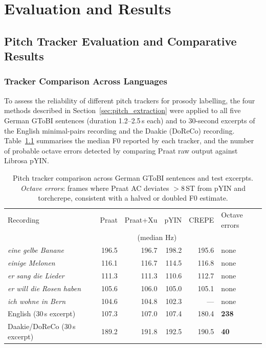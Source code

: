 \chapter{Evaluation and Results}
\label{testing}

\newpage

\section{Pitch Tracker Evaluation and Comparative Results}
\label{sec:tracker_results}

\subsection{Tracker Comparison Across Languages}

To assess the reliability of different pitch trackers for prosody labelling, the four methods described in Section~\ref{sec:pitch_extraction} were applied to all five German GToBI sentences (duration 1.2--2.5\,s each) and to 30-second excerpts of the English minimal-pairs recording and the Daakie (DoReCo) recording. Table~\ref{tab:pitch_comparison} summarises the median F0 reported by each tracker, and the number of probable octave errors detected by comparing Praat raw output against Librosa pYIN.

\begin{table}[h]
\centering
\caption{Pitch tracker comparison across German GToBI sentences and test excerpts.
         \emph{Octave errors}: frames where Praat AC deviates $>$8\,ST from
         pYIN and torchcrepe, consistent with a halved or doubled F0 estimate.}
\label{tab:pitch_comparison}
\small
\begin{tabular}{lrrrrl}
\hline
Recording & \multicolumn{1}{c}{Praat} & \multicolumn{1}{c}{Praat+Xu} &
            \multicolumn{1}{c}{pYIN} & \multicolumn{1}{c}{CREPE} &
            Octave errors \\
          & \multicolumn{4}{c}{(median Hz)} & \\
\hline
\textit{eine gelbe Banane}      & 196.5 & 196.7 & 198.2 & 195.6 & none \\
\textit{einige Melonen}         & 116.1 & 116.7 & 114.5 & 116.8 & none \\
\textit{er sang die Lieder}     & 111.3 & 111.3 & 110.6 & 112.7 & none \\
\textit{er will die Rosen haben}& 105.6 & 106.0 & 105.0 & 105.1 & none \\
\textit{ich wohne in Bern}      & 104.6 & 104.8 & 102.3 & ---   & none \\
English (30\,s excerpt)         & 107.3 & 107.0 & 107.4 & 180.4 & \textbf{238} \\
Daakie/DoReCo (30\,s excerpt)   & 189.2 & 191.8 & 192.5 & 190.5 & \textbf{40} \\
\hline
\end{tabular}
\end{table}

